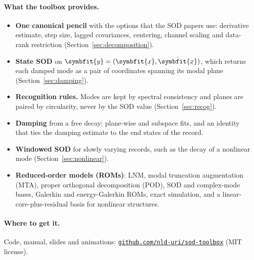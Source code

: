 \documentclass[report]{nld}
\newcommand{\x}{{\symbfit{x}}}
\newcommand{\y}{{\symbfit{y}}}
\newcommand{\code}[1]{\texttt{#1}}
\begin{document}
\paragraph{What the toolbox provides.}
\begin{itemize}
  \item \textbf{One canonical pencil} with the options that the SOD papers use:
    derivative estimate, step size, lagged covariances, centering, channel scaling
    and data-rank restriction (Section~\ref{sec:decomposition}).
  \item \textbf{State SOD} on $\y=(\x,\dot\x)$, which returns each damped mode as a
    pair of coordinates spanning its modal plane (Section~\ref{sec:damping}).
  \item \textbf{Recognition rules.} Modes are kept by spectral consistency and
    planes are paired by circularity, never by the SOD value (Section~\ref{sec:recog}).
  \item \textbf{Damping} from a free decay: plane-wise and subspace fits, and an
    identity that ties the damping estimate to the end states of the record.
  \item \textbf{Windowed SOD} for slowly varying records, such as the decay of a
    nonlinear mode (Section~\ref{sec:nonlinear}).
  \item \textbf{Reduced-order models (ROMs)}: LNM, modal truncation augmentation (MTA), proper orthogonal decomposition (POD), SOD and complex-mode bases,
    Galerkin and energy-Galerkin ROMs, exact simulation, and a
    linear-core-plus-residual basis for nonlinear structures.
\end{itemize}

\paragraph{Where to get it.} Code, manual, slides and animations:
\href{https://github.com/nld-uri/sod-toolbox}{\code{github.com/nld-uri/sod-toolbox}} (MIT license).
\end{document}
